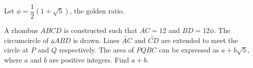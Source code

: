 Let $\phi = \dfrac{1}{2} (1 +\sqrt5)$, the golden ratio.

A rhombus $ABCD$ is constructed such that $AC = 12$ and $BD = 12\phi$. The circumcircle of $\vartriangle ABD$ is drawn. Lines $\overleftrightarrow{AC}$ and $\overleftrightarrow{CD}$ are extended to meet the circle at $P$ and $Q$ respectively. The area of $PQBC$ can be expressed as $a + b\sqrt5$, where $a$ and $b$ are positive integers. Find $a + b$.
